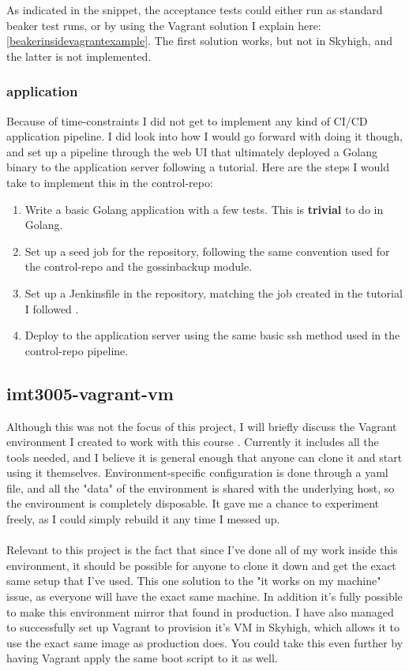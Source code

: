 As indicated in the snippet, the acceptance tests could either run as standard beaker test runs, or by using the Vagrant solution I explain here: \ref{beakerinsidevagrantexample}. The first solution works, but not in Skyhigh, and the latter is not implemented.

\subsubsection{application} \label{applicationpipeline}

Because of time-constraints I did not get to implement any kind of CI/CD application pipeline. I did look into how I would go forward with doing it though, and set up a pipeline through the web UI that ultimately deployed a Golang\cite{golang} binary to the application server following a tutorial\cite{buidonjenkinsandpublishwithpipelines}. Here are the steps I would take to implement this in the control-repo:

\begin{enumerate}
\item Write a basic Golang application with a few tests. This is \textbf{trivial} to do in Golang.
\item Set up a seed job for the repository, following the same convention used for the control-repo and the gossinbackup module.
\item Set up a Jenkinsfile in the repository, matching the job created in the tutorial I followed \cite{buidonjenkinsandpublishwithpipelines}.
\item Deploy to the application server using the same basic ssh method used in the control-repo pipeline.
\end{enumerate}

\subsection{imt3005-vagrant-vm}

Although this was not the focus of this project, I will briefly discuss the Vagrant environment I created to work with this course \cite{tholok97vagrantvm}. Currently it includes all the tools needed, and I believe it is general enough that anyone can clone it and start using it themselves. Environment-specific configuration is done through a yaml file, and all the "data" of the environment is shared with the underlying host, so the environment is completely disposable. It gave me a chance to experiment freely, as I could simply rebuild it any time I messed up.
\\
\\
Relevant to this project is the fact that since I've done all of my work inside this environment, it should be possible for anyone to clone it down and get the exact same setup that I've used. This one solution to the "it works on my machine" issue, as everyone will have the exact same machine. In addition it's fully possible to make this environment mirror that found in production. I have also managed to successfully set up Vagrant to provision it's VM in Skyhigh, which allows it to use the exact same image as production does. You could take this even further by having Vagrant apply the same boot script to it as well.

